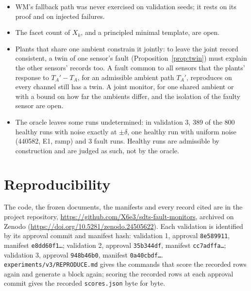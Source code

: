 \begin{itemize}
  larger states.
\item WM's fallback path was never exercised on validation seeds; it rests on its proof and on injected failures.
\item The facet count of $X_k$, and a principled minimal template, are open.
\item Plants that share one ambient constrain it jointly: to leave the joint record consistent, a twin of one
  sensor's fault (Proposition~\ref{prop:twin}) must explain the other sensors' records too. A fault common to all
  sensors that the plants' response to $T_A' - T_A$, for an admissible ambient path $T_A'$, reproduces on every
  channel still has a twin. A
  joint monitor, for one shared ambient or with a bound on how far the ambients differ, and the isolation of the
  faulty sensor are open.
\item The oracle leaves some runs undetermined: in validation 3, 389 of the 800 healthy runs with noise exactly at
  $\pm\delta$, one healthy run with uniform noise (440582, E1, ramp) and 3 fault runs. Healthy runs are admissible by
  construction and are judged as such, not by the oracle.
\end{itemize}

\section{Reproducibility}

The code, the frozen documents, the manifests and every record cited are in the project repository,
\url{https://github.com/X6e3/sdts-fault-monitors}, archived on Zenodo (\url{https://doi.org/10.5281/zenodo.24505622}). Each
validation is identified by its approval commit and manifest hash: validation 1, approval
\texttt{8e589911}, manifest \texttt{e8dd60f1\dots}; validation 2, approval \texttt{35b344df}, manifest
\texttt{cc7adffa\dots}; validation 3, approval \texttt{948b46b0}, manifest \texttt{0a40cbdf\dots}.
\texttt{experiments/v3/REPRODUCE.md} gives the commands that score the recorded rows again and generate a block
again; scoring the recorded rows at each approval commit gives the recorded \texttt{scores.json} byte for byte.
